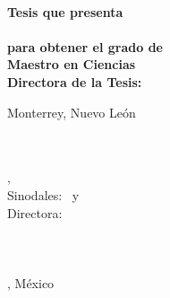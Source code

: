 \begin{titlepage}
	{\Large \color{ctcolortitle}\textbf{\thesisTitle} \\[4mm]}
	{\Large \textbf{Tesis que presenta}} \\[4mm]
	{\Large \thesisName} \\[4mm]
	{\Large \textbf{para obtener el grado de}} \\[4mm]
	{\Large \textbf{Maestro en Ciencias}}\\[4mm]
	{\Large \textbf{Directora de la Tesis:} \thesisFirstSupervisor} \\[5mm]
	\vfill
	\begin{flushleft}
		{\Large Monterrey, Nuevo León}
		\hfill
		{\Large \thesisDate}
	\end{flushleft}

\end{titlepage}


\hfill
\vfill
{
	\small
	\textbf{\thesisName} \\
	\textit{\thesisTitle} \\
	\thesisSubject, \thesisDate \\
	Sinodales: \thesisFirstReviewer\ y \thesisSecondReviewer \\
	Directora: \thesisFirstSupervisor\\[1.5em]
	\textbf{\thesisUniversity} \\
	\thesisUniversityDepartment \\
	\thesisUniversityStreetAddress \thesisUniversityPostalCode\\ 
	\thesisUniversityCity, México
}
